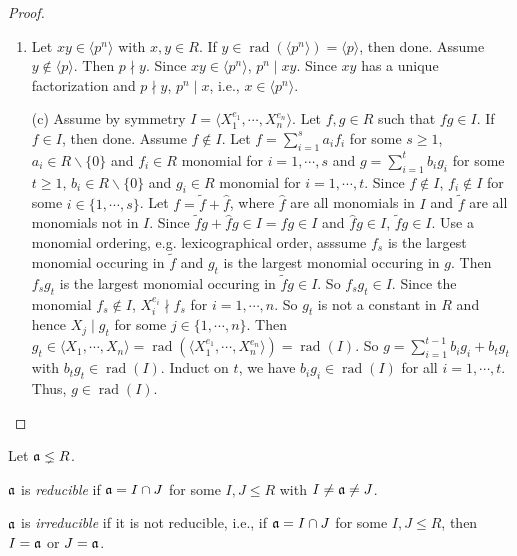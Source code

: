 \begin{proof}
    \begin{enumerate}
        \item Let $xy \in \langle p^{n} \rangle$ with $x,y \in R$. If $y \in \operatorname{rad}(\langle p^{n} \rangle) = \langle p \rangle$, then done. Assume $y \not \in \langle p \rangle$. Then $p \nmid y$. Since $xy \in \langle p^{n} \rangle$, $p^{n} \mid xy$. Since $xy$ has a unique factorization and $p \nmid y$, $p^{n} \mid x$, i.e., $x \in \langle p^{n} \rangle$.
        \item [(c)]  Assume by symmetry $I = \langle X_1^{e_1},\cdots,X_n^{e_n} \rangle$. Let $f,g \in R$ such that $fg \in I$. If $f \in I$, then done. Assume $f \not\in I$. Let $f = \sum_{i=1}^{s}a_if_i$ for some $s \geq 1$, $a_i \in R \smallsetminus \{0\}$ and $f_i \in R$ monomial for $i = 1,\cdots,s$ and $g = \sum_{i=1}^{t}b_ig_i$ for some $t \geq 1$, $b_i \in R \smallsetminus \{0\}$ and $g_i \in R$ monomial for $i = 1,\cdots,t$. Since $f \not \in I$, $f_i \not \in I$ for some $i \in \{1,\cdots,s\}$. Let $f = \tilde f + \hat f$, where $\hat f$ are all monomials in $I$ and $\tilde f$ are all monomials not in $I$. Since $\tilde f g + \hat f g \in I = fg \in I$ and $\hat f g \in I$, $\tilde f g \in I$. Use a monomial ordering, e.g. lexicographical order, asssume $f_s$ is the largest monomial occuring in $\tilde f$ and $g_t$ is the largest monomial occuring in $g$. Then $f_sg_t$ is the largest monomial occuring in $\tilde fg \in I$. So $f_sg_t \in I$. Since the monomial $f_s \not \in I$, $X_i^{e_i} \nmid f_s$ for $i = 1,\cdots,n$. So $g_t$ is not a constant in $R$ and hence $X_j \mid g_t$ for some $j \in \{1,\cdots,n\}$. Then $g_t \in \langle X_1,\cdots,X_n \rangle = \operatorname{rad}(\langle X_1^{e_1},\cdots,X_n^{e_n} \rangle) = \operatorname{rad}(I)$. So $g = \sum_{i=1}^{t-1}b_ig_i + b_tg_t$ with $b_tg_t \in \operatorname{rad}(I)$. Induct on $t$, we have $b_ig_i \in \operatorname{rad}(I)$ for all $i = 1,\cdots,t$. Thus, $g \in \operatorname{rad}(I)$. \qedhere
    \end{enumerate}
\end{proof}

\noindent Let $\mathfrak{a} \lneq R$.

\begin{definition}\label{4.13}
    $\mathfrak{a}$ is \emph{reducible} if $\mathfrak{a} = I \cap J$ for some $I,J \leq R$ with $I \neq \mathfrak{a} \neq J$. \par
    $\mathfrak{a}$ is \emph{irreducible} if it is not reducible, i.e., if $\mathfrak{a} = I \cap J$ for some $I,J \leq R$, then $I = \mathfrak{a}$ or $J = \mathfrak{a}$.
\end{definition}

